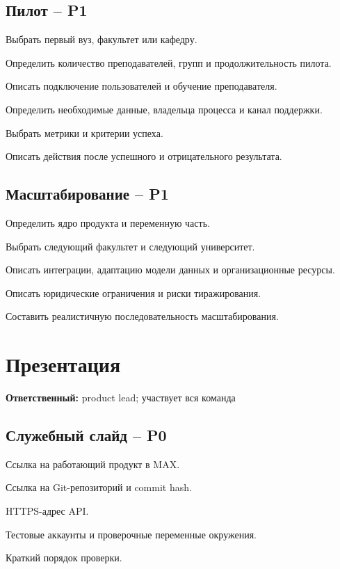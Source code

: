 \documentclass[11pt,a4paper]{article}
\newcommand{\PZero}{\textcolor{PZero}{\textbf{P0}}}
\newcommand{\POne}{\textcolor{POne}{\textbf{P1}}}
\newcommand{\owner}[1]{\textcolor{Muted}{\textbf{Ответственный:} #1}}
\begin{document}
\subsection{Пилот -- \POne}
\begin{tasklist}
  \item Выбрать первый вуз, факультет или кафедру.
  \item Определить количество преподавателей, групп и продолжительность пилота.
  \item Описать подключение пользователей и обучение преподавателя.
  \item Определить необходимые данные, владельца процесса и канал поддержки.
  \item Выбрать метрики и критерии успеха.
  \item Описать действия после успешного и отрицательного результата.
\end{tasklist}

\subsection{Масштабирование -- \POne}
\begin{tasklist}
  \item Определить ядро продукта и переменную часть.
  \item Выбрать следующий факультет и следующий университет.
  \item Описать интеграции, адаптацию модели данных и организационные ресурсы.
  \item Описать юридические ограничения и риски тиражирования.
  \item Составить реалистичную последовательность масштабирования.
\end{tasklist}

\section{Презентация}
\owner{product lead; участвует вся команда}

\subsection{Служебный слайд -- \PZero}
\begin{tasklist}
  \item Ссылка на работающий продукт в MAX.
  \item Ссылка на Git-репозиторий и commit hash.
  \item HTTPS-адрес API.
  \item Тестовые аккаунты и проверочные переменные окружения.
  \item Краткий порядок проверки.
\end{tasklist}
\end{document}
